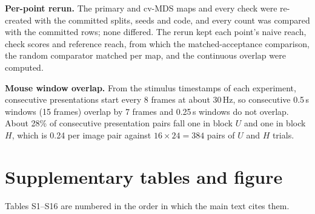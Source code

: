 \documentclass[11pt]{article}
\newcommand{\OvPerPair}{0.24}
\newcommand{\OvShare}{28}
\begin{document}
\textbf{Per-point rerun.} The primary and cv-MDS maps and every check were re-created with the committed splits, seeds and code, and every count was compared with the committed rows; none differed.
The rerun kept each point's naive reach, check scores and reference reach, from which the matched-acceptance comparison, the random comparator matched per map, and the continuous overlap were computed.

\textbf{Mouse window overlap.} From the stimulus timestamps of each experiment, consecutive presentations start every 8 frames at about 30\,Hz, so consecutive 0.5\,s windows (15 frames) overlap by 7 frames and 0.25\,s windows do not overlap.
About \OvShare\% of consecutive presentation pairs fall one in block $U$ and one in block $H$, which is \OvPerPair{} per image pair against $16\times24=384$ pairs of $U$ and $H$ trials.

\section{Supplementary tables and figure}

Tables S1--S16 are numbered in the order in which the main text cites them.
\end{document}
